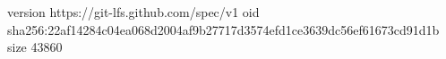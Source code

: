version https://git-lfs.github.com/spec/v1
oid sha256:22af14284c04ea068d2004af9b27717d3574efd1ce3639dc56ef61673cd91d1b
size 43860
